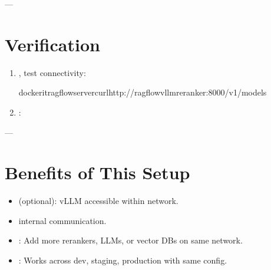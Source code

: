 \documentclass[letterpaper,10pt,english]{sphinxmanual}
\begin{document}
\sphinxAtStartPar
—


\section{Verification}
\label{\detokenize{vllm-network:verification}}\begin{enumerate}
%
\item {} 
\sphinxAtStartPar
{}, test connectivity:

\begin{sphinxVerbatim}[commandchars=\\\{\}]
docker\PYGZhy{}itragflow\PYGZhy{}servercurlhttp://ragflow\PYGZhy{}vllm\PYGZhy{}reranker:8000/v1/models
\end{sphinxVerbatim}

\item {} 
\sphinxAtStartPar
{}:

\begin{sphinxVerbatim}[commandchars=\\\{\}]
\PYG{p}{[}
\PYG{p}{]}
\end{sphinxVerbatim}

\end{enumerate}

\sphinxAtStartPar
—


\section{Benefits of This Setup}
\label{\detokenize{vllm-network:benefits-of-this-setup}}\begin{itemize}
\item {} 
\sphinxAtStartPar
{} (optional): vLLM accessible  within  network.

\item {} 
\sphinxAtStartPar
{} internal communication.

\item {} 
\sphinxAtStartPar
{}: Add more rerankers, LLMs, or vector DBs on same network.

\item {} 
\sphinxAtStartPar
{}: Works across dev, staging, production with same config.

\end{itemize}
\end{document}
